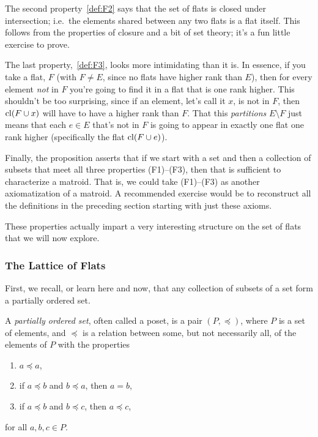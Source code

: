 \documentclass[12pt,oneside]{../../sfsuthesis}
\begin{document}
The second property~\ref{def:F2} says that the set of flats is closed under intersection;
i.e.\ the elements shared between any two flats is a flat itself.
This follows from the properties of closure and a bit of set theory; it's a fun little exercise to prove.

The last property,~\ref{def:F3}, looks more intimidating than it is.
In essence, if you take a flat, \( F \) (with \( F \neq E \), since no flats have higher rank than \( E \)), then for every element \emph{not} in \( F \) you're going to find it in a flat that is one rank higher.
This shouldn't be too surprising, since if an element, let's call it \( x \), is not in \( F \), then \( \operatorname{cl}(F \cup x) \) will have to have a higher rank than \( F \).
That this \emph{partitions} \( E \setminus F \) just means that each \( e \in E \) that's not in \( F \) is going to appear in exactly one flat one rank higher (specifically the flat \( \operatorname{cl}(F \cup e) \)).

Finally, the proposition asserts that if we start with a set and then a collection of subsets that meet all three properties (F1)--(F3), then that is sufficient to characterize a matroid.
That is, we could take (F1)--(F3) as another axiomatization of a matroid.
A recommended exercise would be to reconstruct all the definitions in the preceding section starting with just these axioms.

These properties actually impart a very interesting structure on the set of flats that we will now explore.

\subsubsection{The Lattice of Flats}

First, we recall, or learn here and now, that any collection of subsets of a set form a partially ordered set.

\begin{definition}\th\label{def:poset}
    A \emph{partially ordered set}, often called a poset, is a pair \( (P, \preceq) \), where \( P \) is a set of elements, and \( \preceq \) is a relation between some, but not necessarily all, of the elements of \( P \) with the properties
    \begin{enumerate}[label=\roman*.]
        \item \( a \preceq a \),
        \item if \( a \preceq b \) and \( b \preceq a \), then \( a = b \),
        \item if \( a \preceq b \) and \( b \preceq c \), then \( a \preceq c \),
    \end{enumerate}
    for all \( a, b, c \in P \).
\end{definition}
\end{document}
